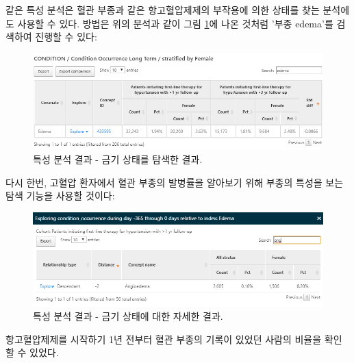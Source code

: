 \documentclass[10.5pt]{book}
\theoremstyle{definition}
\theoremstyle{definition}
\theoremstyle{definition}
\theoremstyle{remark}
\begin{document}
같은 특성 분석은 혈관 부종과 같은 항고혈압제제의 부작용에 의한 상태를
찾는 분석에도 사용할 수 있다. 방법은 위의 분석과 같이 그림
\ref{fig:atlasCharacterizationResultsContra}에 나온 것처럼 '부종
edema'를 검색하여 진행할 수 있다:

\begin{figure}

{\centering \includegraphics[width=1\linewidth]{images/Characterization/atlasCharacterizationResultsContra} 

}

\caption{특성 분석 결과 - 금기 상태를 탐색한 결과.}\label{fig:atlasCharacterizationResultsContra}
\end{figure}

다시 한번, 고혈압 환자에서 혈관 부종의 발병률을 알아보기 위해 부종의
특성을 보는 탐색 기능을 사용할 것이다:

\begin{figure}

{\centering \includegraphics[width=1\linewidth]{images/Characterization/atlasCharacterizationResultsContraExplore} 

}

\caption{특성 분석 결과 - 금기 상태에 대한 자세한 결과.}\label{fig:atlasCharacterizationResultsContraExplore}
\end{figure}

항고혈압제제를 시작하기 1년 전부터 혈관 부종의 기록이 있었던 사람의
비율을 확인할 수 있었다.
\end{document}
